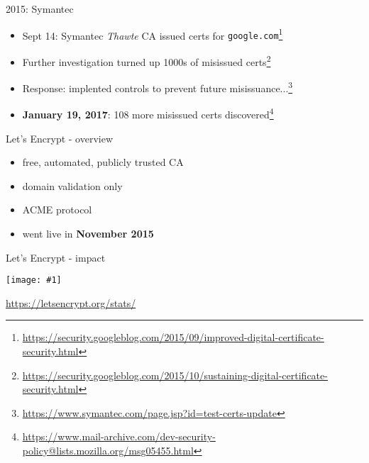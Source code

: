 \documentclass[ignorenonframetext,aspectratio=169]{beamer}
\makeatletter
\def\maxwidth{\ifdim\Gin@nat@width>\linewidth\linewidth\else\Gin@nat@width\fi}
\def\maxheight{\ifdim\Gin@nat@height>\textheight0.8\textheight\else\Gin@nat@height\fi}
\newcommand{\includegraphicsscaled}[1]{
    \texttt{[image: \#1]}
}
\makeatother
\begin{document}
\begin{frame}{2015: Symantec}

\begin{itemize}

\item Sept 14: Symantec {\em Thawte} CA issued certs for
  {\tt google.com}\footnote{\url{https://security.googleblog.com/2015/09/improved-digital-certificate-security.html}}

\item Further investigation turned up 1000s of misissued
  certs\footnote{\url{https://security.googleblog.com/2015/10/sustaining-digital-certificate-security.html}}

\item<+-> Response: implented controls to prevent future
  misissuance...\footnote{\url{https://www.symantec.com/page.jsp?id=test-certs-update}}

\item<+-> {\bf January 19, 2017}: 108 more misissued certs
  discovered\footnote{\url{https://www.mail-archive.com/dev-security-policy@lists.mozilla.org/msg05455.html}}

\end{itemize}

\end{frame}

\begin{frame}[plain]

\begin{center}
\def\svgwidth{.7\textwidth}

\end{center}

\end{frame}

\begin{frame}{Let's Encrypt - overview}

\begin{itemize}
\item
  free, automated, publicly trusted CA
\item
  domain validation only
\item
  ACME protocol
\item
  went live in \textbf{November 2015}
\end{itemize}

\end{frame}

\begin{frame}{Let's Encrypt - impact}

\begin{center}
\includegraphicsscaled{le-growth.png}
\end{center}

\tiny

\url{https://letsencrypt.org/stats/}

\end{frame}
\end{document}
